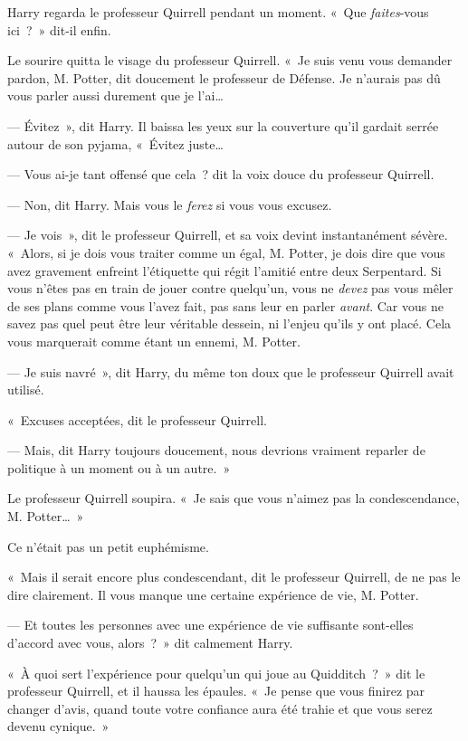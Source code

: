 Harry regarda le professeur Quirrell pendant un moment.
«~Que \emph{faites}-vous ici~?~»
dit-il enfin.

Le sourire quitta le visage du professeur Quirrell.
«~Je suis venu vous demander pardon, M. Potter, dit doucement le professeur de Défense.
Je n'aurais pas dû vous parler aussi durement que je l'ai…

--- Évitez~», dit Harry.
Il baissa les yeux sur la couverture qu'il gardait serrée autour de son pyjama, «~Évitez juste…

--- Vous ai-je tant offensé que cela~? dit la voix douce du professeur Quirrell.

--- Non, dit Harry.
Mais vous le \emph{ferez} si vous vous excusez.

--- Je vois~», dit le professeur Quirrell, et sa voix devint instantanément sévère.
«~Alors, si je dois vous traiter comme un égal, M. Potter, je dois dire que vous avez gravement enfreint l'étiquette qui régit l'amitié entre deux Serpentard.
Si vous n'êtes pas en train de jouer contre quelqu'un, vous ne \emph{devez} pas vous mêler de ses plans comme vous l'avez fait, pas sans leur en parler \emph{avant}.
Car vous ne savez pas quel peut être leur véritable dessein, ni l'enjeu qu'ils y ont placé.
Cela vous marquerait comme étant un ennemi, M. Potter.

--- Je suis navré~», dit Harry, du même ton doux que le professeur Quirrell avait utilisé.

«~Excuses acceptées, dit le professeur Quirrell.

--- Mais, dit Harry toujours doucement, nous devrions vraiment reparler de politique à un moment ou à un autre.~»

Le professeur Quirrell soupira.
«~Je sais que vous n'aimez pas la condescendance, M. Potter…~»

Ce n'était pas un petit euphémisme.

«~Mais il serait encore plus condescendant, dit le professeur Quirrell, de ne pas le dire clairement.
Il vous manque une certaine expérience de vie, M. Potter.

--- Et toutes les personnes avec une expérience de vie suffisante sont-elles d'accord avec vous, alors~?~»
dit calmement Harry.

«~À quoi sert l'expérience pour quelqu'un qui joue au Quidditch~?~»
dit le professeur Quirrell, et il haussa les épaules.
«~Je pense que vous finirez par changer d'avis, quand toute votre confiance aura été trahie et que vous serez devenu cynique.~»

